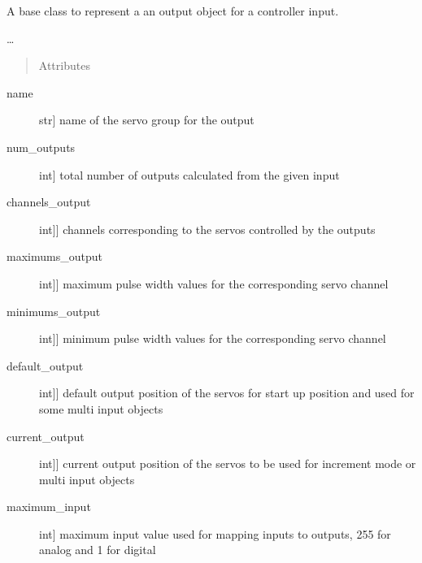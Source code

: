 \documentclass[letterpaper,10pt,english]{sphinxmanual}
\begin{document}
\begin{fulllineitems}
\label{\detokenize{base:OutputObject.OutputObject}}
\sphinxAtStartPar
A base class to represent a an output object for a controller input.

\sphinxAtStartPar
…
\begin{quote}\begin{description}
\item[{Attributes}] \leavevmode
\end{description}\end{quote}
\begin{description}
\item[{name}] \leavevmode{[}str{]}
\sphinxAtStartPar
name of the servo group for the output

\item[{num\_outputs}] \leavevmode{[}int{]}
\sphinxAtStartPar
total number of outputs calculated from the given input

\item[{channels\_output}] \leavevmode{[}{[}int{]}{]}
\sphinxAtStartPar
channels corresponding to the servos controlled by the outputs

\item[{maximums\_output}] \leavevmode{[}{[}int{]}{]}
\sphinxAtStartPar
maximum pulse width values for the corresponding servo channel

\item[{minimums\_output}] \leavevmode{[}{[}int{]}{]}
\sphinxAtStartPar
minimum pulse width values for the corresponding servo channel

\item[{default\_output}] \leavevmode{[}{[}int{]}{]}
\sphinxAtStartPar
default output position of the servos for start up position and used for some multi input objects

\item[{current\_output}] \leavevmode{[}{[}int{]}{]}
\sphinxAtStartPar
current output position of the servos to be used for increment mode or multi input objects

\item[{maximum\_input}] \leavevmode{[}int{]}
\sphinxAtStartPar
maximum input value used for mapping inputs to outputs, 255 for analog and 1 for digital


\end{description}
\end{fulllineitems}
\end{document}
